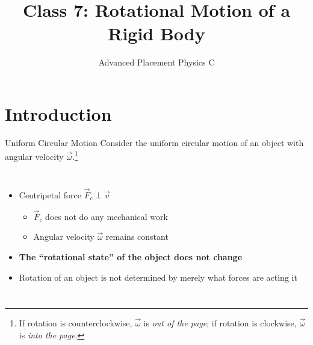 \documentclass[12pt,compress,aspectratio=169]{beamer}
\title{Class 7: Rotational Motion of a Rigid Body}
\subtitle{Advanced Placement Physics C}
\begin{document}
\begin{frame}
  \maketitle
\end{frame}


\section{Introduction}

\begin{frame}{Uniform Circular Motion}
  Consider the uniform circular motion of an object with angular velocity
  $\vec\omega$.\footnote{If rotation is counterclockwise, $\vec\omega$ is
  \emph{out of the page}; if rotation is clockwise, $\vec\omega$ is
  \emph{into the page}.}
  \begin{columns}
    \centering

    \begin{itemize}
    \item Centripetal force $\vec F_c\perp\vec v$
      \begin{itemize}
      \item $\vec F_c$ does not do any mechanical work
      \item Angular velocity $\vec\omega$ remains constant
      \end{itemize}
    \item\textbf{The ``rotational state'' of the object does not change}
    \item Rotation of an object is not determined by merely what forces are
      acting it
    \end{itemize}
  \end{columns}
  \vspace{.3in}
\end{frame}
\end{document}
